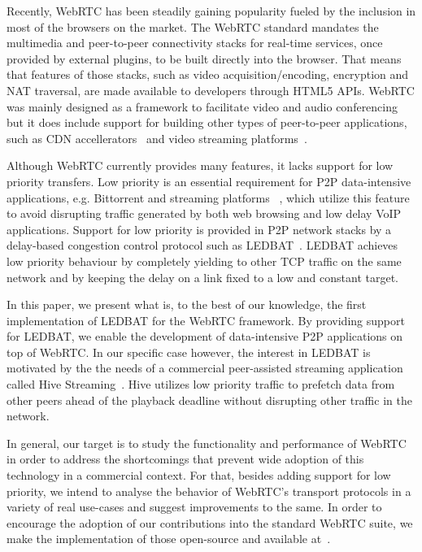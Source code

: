 \documentclass{sig-alternate}
\begin{document}

Recently, WebRTC has been steadily gaining popularity fueled by the inclusion in most of
the browsers on the market. The WebRTC standard mandates the multimedia and peer-to-peer
connectivity stacks for real-time services, once provided by external plugins, to be built
directly into the browser. That means that features of those stacks, such as video
acquisition/encoding, encryption and NAT traversal, are made available to developers
through HTML5 APIs. WebRTC was mainly designed as a framework to facilitate video and
audio conferencing but it does include support for building other types of peer-to-peer
applications, such as CDN accellerators~\cite{peerCDN} and video streaming
platforms~\cite{nurminen2013p2p}.

Although WebRTC currently provides many features, it lacks support for low priority
transfers. Low priority is an essential requirement for P2P data-intensive applications,
e.g. Bittorrent and streaming platforms ~\cite{smoothcache}, which utilize this feature to
avoid disrupting traffic generated by both web browsing and low delay VoIP applications.
Support for low priority is provided in P2P network stacks by a delay-based congestion
control protocol such as LEDBAT~\cite{ledbat}. LEDBAT achieves low priority behaviour by
completely yielding to other TCP traffic on the same network and by keeping the delay on a
link fixed to a low and constant target.

In this paper, we present what is, to the best of our knowledge, the first implementation
of LEDBAT for the WebRTC framework. By providing support for LEDBAT, we enable the
development of data-intensive P2P applications on top of WebRTC. In our specific case
however, the interest in LEDBAT is motivated by the the needs of a commercial
peer-assisted streaming application called Hive Streaming~\cite{hive}. Hive utilizes low
priority traffic to prefetch data from other peers ahead of the playback deadline without
disrupting other traffic in the network.

In general, our target is to study the functionality and performance of WebRTC in order to
address the shortcomings that prevent wide adoption of this technology in a commercial
context. For that, besides adding support for low priority, we intend to analyse the
behavior of WebRTC's transport protocols in a variety of real use-cases and suggest
improvements to the same. In order to encourage the adoption of our contributions into the
standard WebRTC suite, we make the implementation of those open-source and available
at~\cite{webrtc-utp}.
\end{document}
